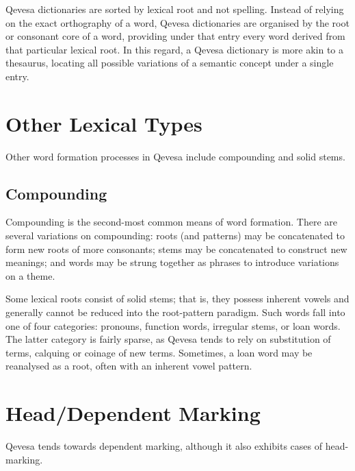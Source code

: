 \documentclass[grammar]{subfiles}
\begin{document}
	Qevesa dictionaries are sorted by lexical root and not spelling. Instead of relying on the exact orthography of a word, Qevesa dictionaries are organised by the root or consonant core of a word, providing under that entry every word derived from that particular lexical root. In this regard, a Qevesa dictionary is more akin to a thesaurus, locating all possible variations of a semantic concept under a single entry.

	\section{Other Lexical Types}
	\label{sec:other_lexical_types}

	Other word formation processes in Qevesa include compounding and solid stems.

	\subsection{Compounding}
	\label{ssec:morph_compounding}

	Compounding is the second-most common means of word formation. There are several variations on compounding: roots (and patterns) may be concatenated to form new roots of more consonants; stems may be concatenated to construct new meanings; and words may be strung together as phrases to introduce variations on a theme.

	Some lexical roots consist of solid stems; that is, they possess inherent vowels and generally cannot be reduced into the root-pattern paradigm. Such words fall into one of four categories: pronouns, function words, irregular stems, or loan words. The latter category is fairly sparse, as Qevesa tends to rely on substitution of terms, calquing or coinage of new terms. Sometimes, a loan word may be reanalysed as a root, often with an inherent vowel pattern.
	
	\section{Head/Dependent Marking}
	\label{sec:head_dependent_marking}

	Qevesa tends towards dependent marking, although it also exhibits cases of head-marking.

	\ToBeWritten

	
\end{document}
